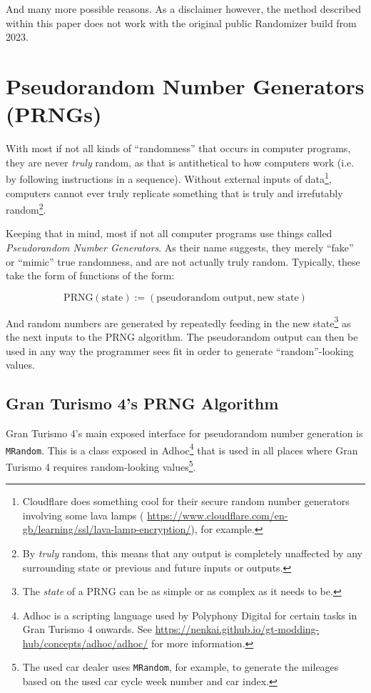 \documentclass[12pt,a4paper,notitlepage]{extarticle}
\begin{document}
        \noindent And many more possible reasons. As a disclaimer however, the method described
        within this paper does not work with the original public Randomizer build from 2023.

    \section*{Pseudorandom Number Generators (PRNGs)}
        With most if not all kinds of ``randomness'' that occurs in computer programs, they are
        never \textit{truly} random, as that is antithetical to how computers work (i.e. by
        following instructions in a sequence). Without external inputs of data\footnote{
        Cloudflare does something cool for their secure random number generators
        involving some lava lamps (
        \url{https://www.cloudflare.com/en-gb/learning/ssl/lava-lamp-encryption/}),
        for example.}, computers cannot ever truly replicate something that is truly and
        irrefutably random\footnote{By \textit{truly} random, this means that any output is
        completely unaffected by any surrounding state or previous and future inputs or
        outputs.}.

        Keeping that in mind, most if not all computer programs use things called \textit{
        Pseudorandom Number Generators}. As their name suggests, they merely ``fake'' or
        ``mimic'' true randomness, and are not actually truly random. Typically, these take
        the form of functions of the form:

        \begin{equation*}
            \text{PRNG}(\text{state}) := (\text{pseudorandom output}, \text{new state})
        \end{equation*}

        And random numbers are generated by repeatedly feeding in the new state\footnote{
        The \textit{state} of a PRNG can be as simple or as complex as it needs to be.} as
        the next inputs to the PRNG algorithm. The pseudorandom output can then be used in
        any way the programmer sees fit in order to generate ``random''-looking values.

        \subsection*{Gran Turismo 4's PRNG Algorithm}
            Gran Turismo 4's main exposed interface for pseudorandom number generation is
            \texttt{MRandom}. This is a class exposed in Adhoc\footnote{Adhoc is a scripting
            language used by Polyphony Digital for certain tasks in Gran Turismo 4 onwards.
            See \url{https://nenkai.github.io/gt-modding-hub/concepts/adhoc/adhoc/} for more 
            information.} that is used in all places where Gran Turismo 4 requires
            random-looking values\footnote{The used car dealer uses \texttt{MRandom}, for
            example, to generate the mileages based on the used car cycle week number and car
            index.}.
\end{document}

